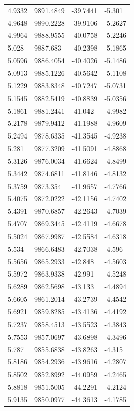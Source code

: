 \begin{table}[H]
\begin{tabular}{llll}
4.9332 & 9891.4849 & -39.7441 & -5.301 \\
4.9648 & 9890.2228 & -39.9106 & -5.2627 \\
4.9964 & 9888.9555 & -40.0758 & -5.2246 \\
5.028 & 9887.683 & -40.2398 & -5.1865 \\
5.0596 & 9886.4054 & -40.4026 & -5.1486 \\
5.0913 & 9885.1226 & -40.5642 & -5.1108 \\
5.1229 & 9883.8348 & -40.7247 & -5.0731 \\
5.1545 & 9882.5419 & -40.8839 & -5.0356 \\
5.1861 & 9881.2441 & -41.042 & -4.9982 \\
5.2178 & 9879.9412 & -41.1988 & -4.9609 \\
5.2494 & 9878.6335 & -41.3545 & -4.9238 \\
5.281 & 9877.3209 & -41.5091 & -4.8868 \\
5.3126 & 9876.0034 & -41.6624 & -4.8499 \\
5.3442 & 9874.6811 & -41.8146 & -4.8132 \\
5.3759 & 9873.354 & -41.9657 & -4.7766 \\
5.4075 & 9872.0222 & -42.1156 & -4.7402 \\
5.4391 & 9870.6857 & -42.2643 & -4.7039 \\
5.4707 & 9869.3445 & -42.4119 & -4.6678 \\
5.5024 & 9867.9987 & -42.5584 & -4.6318 \\
5.534 & 9866.6483 & -42.7038 & -4.596 \\
5.5656 & 9865.2933 & -42.848 & -4.5603 \\
5.5972 & 9863.9338 & -42.991 & -4.5248 \\
5.6289 & 9862.5698 & -43.133 & -4.4894 \\
5.6605 & 9861.2014 & -43.2739 & -4.4542 \\
5.6921 & 9859.8285 & -43.4136 & -4.4192 \\
5.7237 & 9858.4513 & -43.5523 & -4.3843 \\
5.7553 & 9857.0697 & -43.6898 & -4.3496 \\
5.787 & 9855.6838 & -43.8263 & -4.315 \\
5.8186 & 9854.2936 & -43.9616 & -4.2807 \\
5.8502 & 9852.8992 & -44.0959 & -4.2465 \\
5.8818 & 9851.5005 & -44.2291 & -4.2124 \\
5.9135 & 9850.0977 & -44.3613 & -4.1785 \\

\end{tabular}
\end{table}
